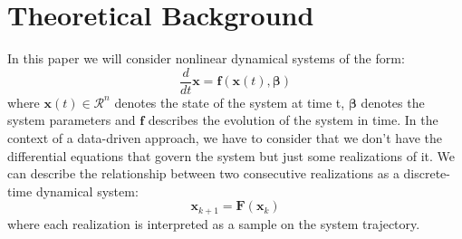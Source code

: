 \documentclass[]{article}
\begin{document}
\section{Theoretical Background}
In this paper we will consider nonlinear dynamical systems of the form:
\begin{equation}\label{dynsys1}
    \frac{d}{dt}\textbf{x} =\textbf{f}(\textbf{x}(t), \boldsymbol\beta)
\end{equation}
where $\textbf{x}(t) \in \mathcal{R}^n$ denotes the state of the system at time t, $\boldsymbol\beta$ denotes the system parameters and $\textbf{f}$ describes the evolution of the system in time.
In the context of a data-driven approach, we have to consider that we don't have the differential equations that govern the system but just some realizations of it. We can describe the relationship between two consecutive realizations as a discrete-time dynamical system:
\begin{equation}\label{dynsys2}
    \textbf{x}_{k+1} =\textbf{F}(\textbf{x}_k)
\end{equation}
where each realization is interpreted as a sample on the system trajectory.
%
\end{document}
